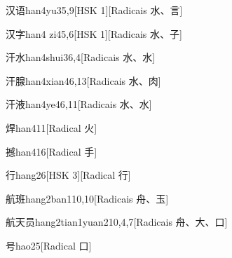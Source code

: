 \begin{entry}{汉语}{han4yu3}{5,9}[HSK 1][Radicais ⽔、⾔]
\end{entry}

\begin{entry}{汉字}{han4 zi4}{5,6}[HSK 1][Radicais ⽔、⼦]
\end{entry}

\begin{entry}{汗水}{han4shui3}{6,4}[Radicais ⽔、⽔]
\end{entry}

\begin{entry}{汗腺}{han4xian4}{6,13}[Radicais ⽔、⾁]
\end{entry}

\begin{entry}{汗液}{han4ye4}{6,11}[Radicais ⽔、⽔]
\end{entry}

\begin{entry}{焊}{han4}{11}[Radical ⽕]
\end{entry}

\begin{entry}{撼}{han4}{16}[Radical ⼿]
\end{entry}

\begin{entry}{行}{hang2}{6}[HSK 3][Radical ⾏]
\end{entry}

\begin{entry}{航班}{hang2ban1}{10,10}[Radicais ⾈、⽟]
\end{entry}

\begin{entry}{航天员}{hang2tian1yuan2}{10,4,7}[Radicais ⾈、⼤、⼝]
\end{entry}

\begin{entry}{号}{hao2}{5}[Radical ⼝]
\end{entry}

